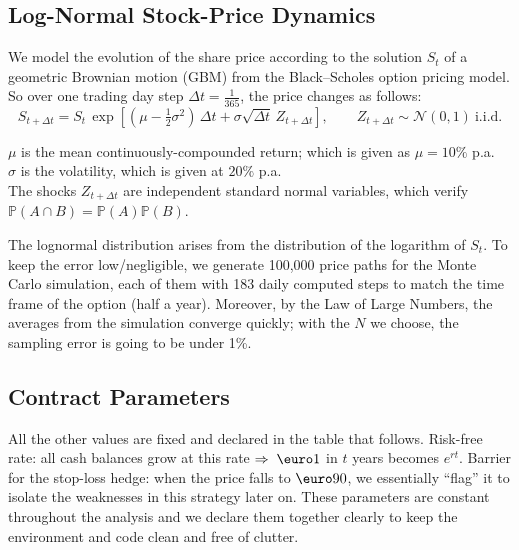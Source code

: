 \documentclass[11pt,a4paper]{article}
\begin{document}
\subsection{Log-Normal Stock-Price Dynamics}

We model the evolution of the share price according to the solution \( S_t \) of a geometric Brownian motion (GBM) from the Black--Scholes option pricing model. So over one trading day step \( \Delta t = \frac{1}{365} \), the price changes as follows:
\[
S_{t+\Delta t} = S_t \,\exp\!\left[(\mu - \tfrac{1}{2}\sigma^{2})\,\Delta t
+ \sigma\sqrt{\Delta t}\,Z_{t+\Delta t}\right],
\qquad Z_{t+\Delta t} \sim \mathcal{N}(0,1)\ \text{i.i.d.}
\]

\( \mu \) is the mean continuously-compounded return; which is given as \( \mu = 10\% \) p.a. \\
\( \sigma \) is the volatility, which is given at \( 20\% \) p.a. \\
The shocks \( Z_{t+\Delta t} \) are independent standard normal variables, which verify \( \mathbb{P}(A \cap B) = \mathbb{P}(A)\mathbb{P}(B) \).

The lognormal distribution arises from the distribution of the logarithm of \( S_t \). To keep the error low/negligible, we generate 100{,}000 price paths for the Monte Carlo simulation, each of them with 183 daily computed steps to match the time frame of the option (half a year). Moreover, by the Law of Large Numbers, the averages from the simulation converge quickly; with the \( N \) we choose, the sampling error is going to be under 1\%.

\subsection{Contract Parameters}

All the other values are fixed and declared in the table that follows. Risk-free rate: all cash balances grow at this rate \( \Rightarrow\; \text{\euro}1 \) in \( t \) years becomes \( e^{rt} \). Barrier for the stop-loss hedge: when the price falls to \( \text{\euro}90 \), we essentially “flag” it to isolate the weaknesses in this strategy later on. These parameters are constant throughout the analysis and we declare them together clearly to keep the environment and code clean and free of clutter.
	
\end{document}

